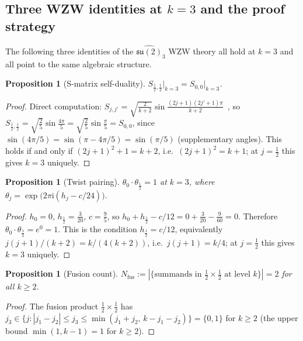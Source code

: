 \documentclass[11pt,a4paper]{article}
\newtheorem{proposition}[theorem]{Proposition}
\theoremstyle{remark}
\begin{document}
\subsection{Three WZW identities at $k=3$ and the proof strategy}
\label{P2:sec:wzw}

The following three identities of the $\widehat{\mathfrak{su}(2)}_3$ WZW
theory all hold at $k=3$ and all point to the same algebraic structure.

\begin{proposition}[S-matrix self-duality]
\label{P2:prop:Sselfdual}
$S_{\frac{1}{2},\frac{1}{2}}\big|_{k=3} = S_{0,0}\big|_{k=3}$.
\end{proposition}
\begin{proof}
Direct computation: $S_{j,j'} = \sqrt{\tfrac{2}{k+2}}\sin\tfrac{(2j+1)(2j'+1)\pi}{k+2}$~\cite{KZ1984},
so $S_{\frac{1}{2},\frac{1}{2}} = \sqrt{\tfrac{2}{5}}\sin\tfrac{4\pi}{5}
= \sqrt{\tfrac{2}{5}}\sin\tfrac{\pi}{5} = S_{0,0}$,
since $\sin(4\pi/5)=\sin(\pi-4\pi/5)=\sin(\pi/5)$ (supplementary angles).
This holds if and only if $(2j+1)^2+1=k+2$, i.e.\ $(2j+1)^2=k+1$;
at $j=\frac{1}{2}$ this gives $k=3$ uniquely.
\end{proof}

\begin{proposition}[Twist pairing]
\label{P2:prop:twist}
$\theta_0\cdot\theta_{\frac{1}{2}} = 1$ at $k=3$,
where $\theta_j = \exp\bigl(2\pi\mathrm{i}(h_j - c/24)\bigr)$.
\end{proposition}
\begin{proof}
$h_0=0$, $h_{\frac{1}{2}}=\frac{3}{20}$, $c = \frac{9}{5}$, so
$h_0 + h_{\frac{1}{2}} - c/12 = 0 + \tfrac{3}{20} - \tfrac{9}{60} = 0$.
Therefore $\theta_0\cdot\theta_{\frac{1}{2}} = e^{0} = 1$.
This is the condition $h_{\frac{1}{2}} = c/12$, equivalently
$j(j+1)/(k+2) = k/(4(k+2))$, i.e.\ $j(j+1) = k/4$;
at $j=\frac{1}{2}$ this gives $k=3$ uniquely.
\end{proof}

\begin{proposition}[Fusion count]
\label{P2:prop:Nfus}
$N_{\mathrm{fus}} := |\{\text{summands in }\tfrac{1}{2}{\times}\tfrac{1}{2}
  \text{ at level }k\}| = 2$ for all $k\geq 2$.
\end{proposition}
\begin{proof}
The fusion product $\frac{1}{2}\times\frac{1}{2}$ has
$j_3\in\{j:|j_1-j_2|\leq j_3\leq\min(j_1+j_2,\,k-j_1-j_2)\}
= \{0,1\}$ for $k\geq 2$ (the upper bound $\min(1,k-1)=1$ for $k\geq 2$).
\end{proof}
\end{document}
